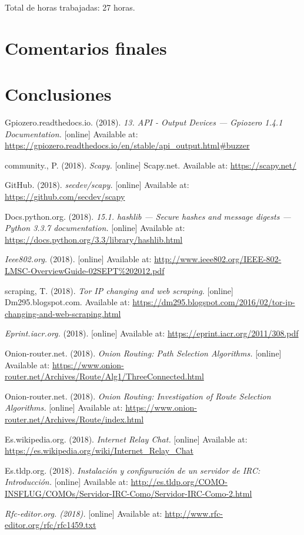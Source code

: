 \documentclass{article}
\begin{document}
Total de horas trabajadas: 27 horas.

\section{Comentarios finales}
\section{Conclusiones}

\begin{thebibliography}{9}
  Gpiozero.readthedocs.io. (2018). \emph{13. API - Output Devices — Gpiozero 1.4.1 Documentation.}
  [online] Available at: \url{https://gpiozero.readthedocs.io/en/stable/api\_output.html\#buzzer}
  
  community., P. (2018). \emph{Scapy.}
  [online] Scapy.net. Available at: \url{https://scapy.net/}
  
   GitHub. (2018). \emph{secdev/scapy.}
  [online] Available at: \url{https://github.com/secdev/scapy}

   Docs.python.org. (2018). \emph{15.1. hashlib — Secure hashes and message digests — Python 3.3.7 documentation.}
  [online] Available at: \url{https://docs.python.org/3.3/library/hashlib.html}

   \emph{Ieee802.org.} (2018).
  [online] Available at: \url{http://www.ieee802.org/IEEE-802-LMSC-OverviewGuide-02SEPT%202012.pdf}

   scraping, T. (2018). \emph{Tor IP changing and web scraping.}
  [online] Dm295.blogspot.com. Available at: \url{https://dm295.blogspot.com/2016/02/tor-ip-changing-and-web-scraping.html}

   \emph{Eprint.iacr.org.} (2018).
  [online] Available at: \url{https://eprint.iacr.org/2011/308.pdf}

   Onion-router.net. (2018). \emph{Onion Routing: Path Selection Algorithms.}
  [online] Available at: \url{https://www.onion-router.net/Archives/Route/Alg1/ThreeConnected.html}

   Onion-router.net. (2018). \emph{Onion Routing: Investigation of Route Selection Algorithms.}
  [online] Available at: \url{https://www.onion-router.net/Archives/Route/index.html}

   Es.wikipedia.org. (2018). \emph{Internet Relay Chat.}
  [online] Available at: \url{https://es.wikipedia.org/wiki/Internet_Relay_Chat}

   Es.tldp.org. (2018). \emph{Instalación y configuración de un servidor de IRC: Introducción.}
  [online] Available at: \url{http://es.tldp.org/COMO-INSFLUG/COMOs/Servidor-IRC-Como/Servidor-IRC-Como-2.html}

   \emph{Rfc-editor.org. (2018).}
  [online] Available at: \url{http://www.rfc-editor.org/rfc/rfc1459.txt}
\end{thebibliography}
\end{document}
